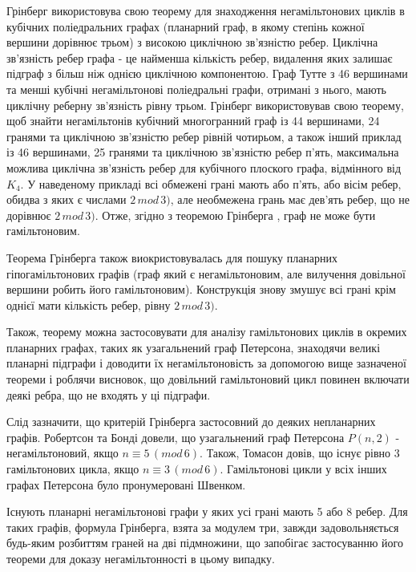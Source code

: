 \documentclass[14pt]{article}
\begin{document}
\begin{spacing}{1.175}
            Грінберг використовува свою теорему для знаходження негамільтонових циклів в кубічних поліедральних графах (планарний граф, в якому степінь кожної вершини дорівнює трьом) з високою циклічною зв'язністю ребер. Циклічна зв'язність ребер графа - це найменша кількість ребер, видалення яких залишає підграф з більш ніж однією циклічною компонентою. Граф Тутте з 46 вершинами та менші кубічні негамільтонові поліедральні графи, отримані з нього, мають циклічну реберну зв’язність рівну трьом. Грінберг використовував свою теорему, щоб знайти негамільтонів кубічний многогранний граф із 44 вершинами, 24 гранями та циклічною зв’язністю ребер рівній чотирьом, а також інший приклад із 46 вершинами, 25 гранями та циклічною зв’язністю ребер п’ять, максимальна можлива циклічна зв’язність ребер для кубічного плоского графа, відмінного від \(K_4\). У наведеному прикладі всі обмежені грані мають або п’ять, або вісім ребер, обидва з яких є числами \(2\,mod\,3)\), але необмежена грань має дев’ять ребер, що не дорівнює \(2\,mod\,3)\). Отже, згідно з теоремою Грінберга , граф не може бути гамільтоновим.

            Теорема Грінберга також виокристовувалась для пошуку планарних гіпогамільтонових графів (граф який є негамільтоновим, але вилучення довільної вершини робить його гамільтоновим). Конструкція знову змушує всі грані крім однієї мати кількість ребер, рівну \(2\,mod\,3)\). 

            Також, теорему можна застосовувати для аналізу гамільтонових циклів в окремих планарних графах, таких як узагальнений граф Петерсона, знаходячи великі планарні підграфи і доводити їх негамільтоновість за допомогою вище зазначеної теореми і роблячи висновок, що довільний гамільтоновий цикл повинен включати деякі ребра, що не входять у ці підграфи.

            Слід зазначити, що критерій Грінберга застосовний до деяких непланарних графів. Робертсон та Бонді довели, що узагальнений граф Петерсона \(P(n,2)\) - негамільтоновий, якщо \( n \equiv 5\,(mod\,6)\). Також, Томасон довів, що існує рівно 3 гамільтонових цикла, якщо \( n \equiv 3\,(mod\,6)\). Гамільтонові цикли у всіх інших графах Петерсона було пронумеровані Швенком.

            Існують планарні негамільтонові графи у яких усі грані мають 5 або 8 ребер. Для таких графів, формула Грінберга, взята за модулем три, завжди задовольняється будь-яким розбиттям граней на дві підмножини, що запобігає застосуванню його теореми для доказу негамільтонності в цьому випадку.


\end{spacing}
\end{document}
